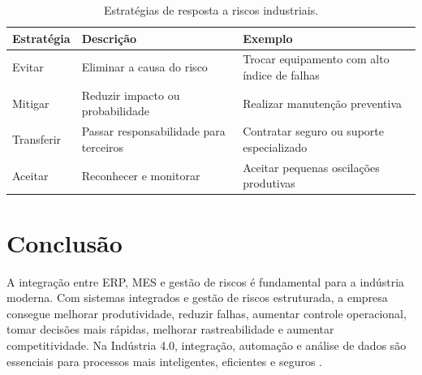 \documentclass[12pt,a4paper,oneside]{article}
\begin{document}
\begin{table}[htb]
  \centering
  \caption{Estratégias de resposta a riscos industriais.}
  \label{tab:riscos}
  \begin{tabular}{p{3.5cm}p{4cm}p{6cm}}
    \toprule
    \textbf{Estratégia} & \textbf{Descrição} & \textbf{Exemplo} \\
    \midrule
    Evitar & Eliminar a causa do risco & Trocar equipamento com alto índice de falhas \\
    Mitigar & Reduzir impacto ou probabilidade & Realizar manutenção preventiva \\
    Transferir & Passar responsabilidade para terceiros & Contratar seguro ou suporte especializado \\
    Aceitar & Reconhecer e monitorar & Aceitar pequenas oscilações produtivas \\
    \bottomrule
  \end{tabular}
\end{table}

\section{Conclusão}

A integração entre ERP, MES e gestão de riscos é fundamental para a indústria moderna. Com sistemas integrados e gestão de riscos estruturada, a empresa consegue melhorar produtividade, reduzir falhas, aumentar controle operacional, tomar decisões mais rápidas, melhorar rastreabilidade e aumentar competitividade. Na Indústria 4.0, integração, automação e análise de dados são essenciais para processos mais inteligentes, eficientes e seguros \cite{schwab2016}.



\end{document}
